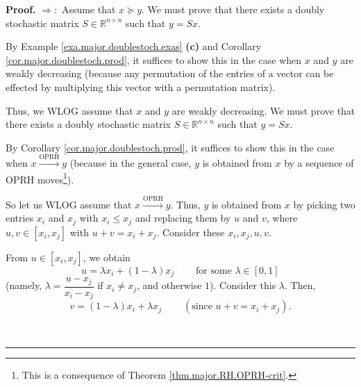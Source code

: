 \documentclass[numbers=enddot,12pt,final,onecolumn,notitlepage]{scrartcl}%
\numberwithin{exer}{subsection}
\theoremstyle{definition}
\newenvironment{proof}[1][Proof]{\noindent\textbf{#1.} }{\ \rule{0.5em}{0.5em}}
\begin{document}
\begin{proof}
$\Longrightarrow:$ Assume that $x\succcurlyeq y$. We must prove that there
exists a doubly stochastic matrix $S\in\mathbb{R}^{n\times n}$ such that
$y=Sx$.

By Example \ref{exa.major.doublestoch.exas} \textbf{(c)} and Corollary
\ref{cor.major.doublestoch.prod}, it suffices to show this in the case when
$x$ and $y$ are weakly decreasing (because any permutation of the entries of a
vector can be effected by multiplying this vector with a permutation matrix).

Thus, we WLOG assume that $x$ and $y$ are weakly decreasing. We must prove
that there exists a doubly stochastic matrix $S\in\mathbb{R}^{n\times n}$ such
that $y=Sx$.

By Corollary \ref{cor.major.doublestoch.prod}, it suffices to show this in the
case when $x\overset{\text{OPRH}}{\longrightarrow}y$ (because in the general
case, $y$ is obtained from $x$ by a sequence of OPRH moves\footnote{This is a
consequence of Theorem \ref{thm.major.RH.OPRH-crit}.}).

So let us WLOG assume that $x\overset{\text{OPRH}}{\longrightarrow}y$. Thus,
$y$ is obtained from $x$ by picking two entries $x_{i}$ and $x_{j}$ with
$x_{i}\leq x_{j}$ and replacing them by $u$ and $v$, where $u,v\in\left[
x_{i},x_{j}\right]  $ with $u+v=x_{i}+x_{j}$. Consider these $x_{i},x_{j},u,v$.

From $u\in\left[  x_{i},x_{j}\right]  $, we obtain
\[
u=\lambda x_{i}+\left(  1-\lambda\right)  x_{j}\ \ \ \ \ \ \ \ \ \ \text{for
some }\lambda\in\left[  0,1\right]
\]
(namely, $\lambda=\dfrac{u-x_{j}}{x_{i}-x_{j}}$ if $x_{i}\neq x_{j}$, and
otherwise $1$). Consider this $\lambda$. Then,%
\[
v=\left(  1-\lambda\right)  x_{i}+\lambda x_{j}\ \ \ \ \ \ \ \ \ \ \left(
\text{since }u+v=x_{i}+x_{j}\right)  .
\]



\end{proof}
\end{document}
